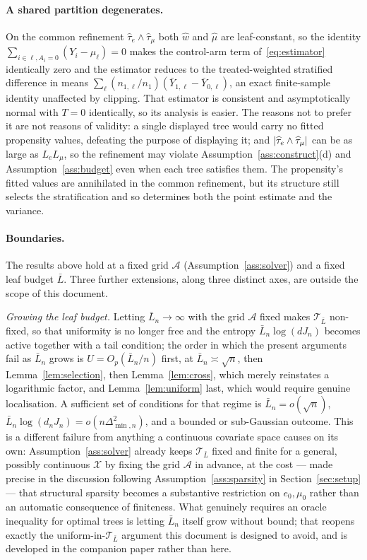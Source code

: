 \documentclass[11pt]{article}
\theoremstyle{plain}
\theoremstyle{definition}
\theoremstyle{remark}
\newcommand{\cX}{\mathcal{X}}
\newcommand{\cA}{\mathcal{A}}
\newcommand{\cT}{\mathcal{T}}
\newcommand{\ez}{e_0}
\newcommand{\mz}{\mu_0}
\newcommand{\mhat}{\widehat{\mu}}
\newcommand{\what}{\widehat{w}}
\newcommand{\that}{\widehat{\tau}}
\DeclarePairedDelimiter{\card}{\lvert}{\rvert}
\begin{document}
\paragraph{A shared partition degenerates.}
On the common refinement $\that_e\wedge\that_\mu$ both $\what$ and $\mhat$ are
leaf-constant, so the identity $\sum_{i\in\ell,A_i=0}(Y_i-\mhat_\ell)=0$ makes
the control-arm term of~\eqref{eq:estimator} identically zero and the estimator
reduces to the treated-weighted stratified difference in means
$\sum_\ell(n_{1,\ell}/n_1)(\bar Y_{1,\ell}-\bar Y_{0,\ell})$, an exact
finite-sample identity unaffected by clipping. That estimator is consistent and
asymptotically normal with $T=0$ identically, so its analysis is easier. The
reasons not to prefer it are not reasons of validity: a single displayed tree
would carry no fitted propensity values, defeating the purpose of displaying it;
and $\card{\that_e\wedge\that_\mu}$ can be as large as $L_eL_\mu$, so the
refinement may violate Assumption~\ref{ass:construct}(d) and
Assumption~\ref{ass:budget} even when each tree satisfies them. The propensity's
fitted values are annihilated in the common refinement, but its structure still
selects the stratification and so determines both the point estimate and the
variance.

\paragraph{Boundaries.}
The results above hold at a fixed grid $\cA$ (Assumption~\ref{ass:solver}) and
a fixed leaf budget $\bar L$. Three further extensions, along three distinct
axes, are outside the scope of this document.

\emph{Growing the leaf budget.} Letting $\bar L_n\to\infty$ with the grid
$\cA$ fixed makes $\cT_{\bar L}$ non-fixed, so that uniformity is no longer
free and the entropy $\bar L_n\log(dJ_n)$ becomes active together with a tail
condition; the order in which the present arguments fail as $\bar L_n$ grows
is $U=O_p(\bar L_n/n)$ first, at $\bar L_n\asymp\sqrt n$, then
Lemma~\ref{lem:selection}, then Lemma~\ref{lem:cross}, which merely reinstates
a logarithmic factor, and Lemma~\ref{lem:uniform} last, which would require
genuine localisation. A sufficient set of conditions for that regime is
$\bar L_n=o(\sqrt n)$, $\bar L_n\log(d_nJ_n)=o(n\Delta_{\min,n}^2)$, and a
bounded or sub-Gaussian outcome. This is a different failure from anything a
continuous covariate space causes on its own: Assumption~\ref{ass:solver}
already keeps $\cT_{\bar L}$ fixed and finite for a general, possibly
continuous $\cX$ by fixing the grid $\cA$ in advance, at the cost --- made
precise in the discussion following Assumption~\ref{ass:sparsity} in
Section~\ref{sec:setup} --- that structural sparsity becomes a substantive
restriction on $\ez,\mz$ rather than an automatic consequence of finiteness.
What genuinely requires an oracle inequality for optimal trees is letting
$\bar L_n$ itself grow without bound; that reopens exactly the
uniform-in-$\cT_{\bar L}$ argument this document is designed to avoid, and is
developed in the companion paper rather than here.
\end{document}
